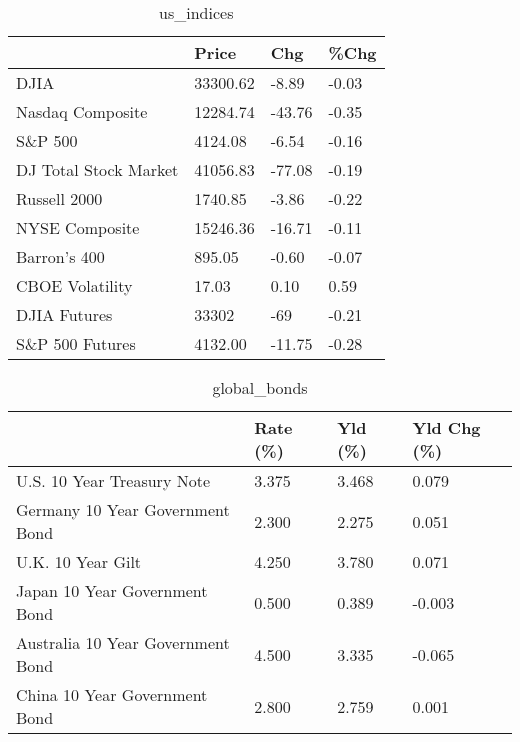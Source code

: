 \documentclass{article}%
\begin{document}
%


\begin{table}[htbp]%
\caption{us\_indices}%
\centering%
\begin{adjustbox}{width=1\textwidth}%
\begin{tabular}{llll}
\toprule
                      &    Price &    Chg &  \%Chg \\
\midrule
                 DJIA & 33300.62 &  -8.89 & -0.03 \\
     Nasdaq Composite & 12284.74 & -43.76 & -0.35 \\
              S\&P 500 &  4124.08 &  -6.54 & -0.16 \\
DJ Total Stock Market & 41056.83 & -77.08 & -0.19 \\
         Russell 2000 &  1740.85 &  -3.86 & -0.22 \\
       NYSE Composite & 15246.36 & -16.71 & -0.11 \\
         Barron's 400 &   895.05 &  -0.60 & -0.07 \\
      CBOE Volatility &    17.03 &   0.10 &  0.59 \\
         DJIA Futures &    33302 &    -69 & -0.21 \\
      S\&P 500 Futures &  4132.00 & -11.75 & -0.28 \\
\bottomrule
\end{tabular}
%
\end{adjustbox}%
\end{table}

%


\begin{table}[htbp]%
\caption{global\_bonds}%
\centering%
\begin{adjustbox}{width=1\textwidth}%
\begin{tabular}{llll}
\toprule
                                  & Rate (\%) & Yld (\%) & Yld Chg (\%) \\
\midrule
       U.S. 10 Year Treasury Note &    3.375 &   3.468 &       0.079 \\
  Germany 10 Year Government Bond &    2.300 &   2.275 &       0.051 \\
                U.K. 10 Year Gilt &    4.250 &   3.780 &       0.071 \\
    Japan 10 Year Government Bond &    0.500 &   0.389 &      -0.003 \\
Australia 10 Year Government Bond &    4.500 &   3.335 &      -0.065 \\
    China 10 Year Government Bond &    2.800 &   2.759 &       0.001 \\
\bottomrule
\end{tabular}
%
\end{adjustbox}%
\end{table}
\end{document}
